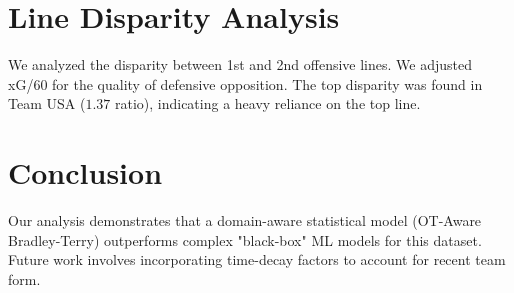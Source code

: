 \documentclass[conference]{IEEEtran}
\begin{document}
\section{Line Disparity Analysis}
\label{sec:line}
We analyzed the disparity between 1st and 2nd offensive lines. We adjusted xG/60 for the quality of defensive opposition.
The top disparity was found in Team USA ($1.37$ ratio), indicating a heavy reliance on the top line.

\section{Conclusion}
\label{sec:conc}
Our analysis demonstrates that a domain-aware statistical model (OT-Aware Bradley-Terry) outperforms complex "black-box" ML models for this dataset. Future work involves incorporating time-decay factors to account for recent team form.



\end{document}
